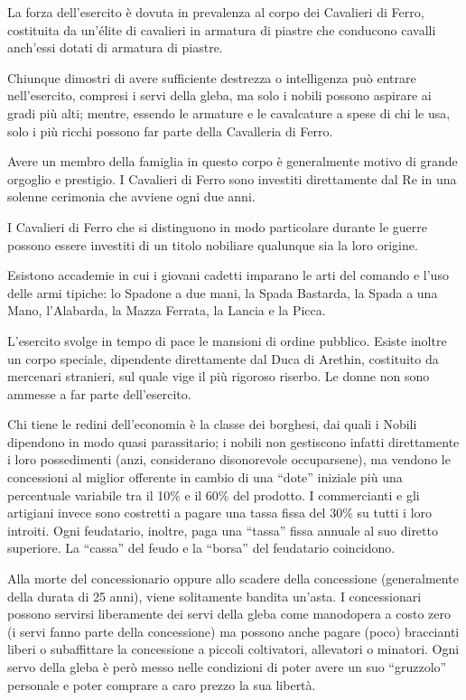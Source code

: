 La forza dell'esercito \`e dovuta in prevalenza al corpo dei Cavalieri
di Ferro, costituita da un'\'elite di cavalieri in armatura di piastre
che conducono cavalli anch'essi dotati di armatura di piastre.

Chiunque dimostri di avere sufficiente destrezza o intelligenza
pu\`o entrare nell'esercito, compresi i servi della gleba, ma solo i
nobili possono aspirare ai gradi pi\`u alti; mentre, essendo le
armature e le cavalcature a spese di chi le usa, solo i pi\`u ricchi
possono far parte della Cavalleria di Ferro.

Avere un membro della famiglia in questo corpo \`e generalmente
motivo di grande orgoglio e prestigio. I Cavalieri di Ferro sono
investiti direttamente dal Re in una solenne cerimonia che avviene
ogni due anni.

I Cavalieri di Ferro che si distinguono in modo particolare durante le
guerre possono essere investiti di un titolo nobiliare qualunque sia
la loro origine.

Esistono accademie in cui i giovani cadetti imparano le arti del
comando e l'uso delle armi tipiche: lo Spadone a due mani, la Spada
Bastarda, la Spada a una Mano, l'Alabarda, la Mazza Ferrata, la Lancia
e la Picca. 

L'esercito svolge in tempo di pace le mansioni di ordine pubblico.
Esiste inoltre un corpo speciale, dipendente direttamente dal Duca di
Arethin, costituito da mercenari stranieri, sul quale vige il pi\`u
rigoroso riserbo. Le donne non sono ammesse a far parte dell'esercito.

\Economia Chi tiene le redini dell'economia \`e la classe dei
borghesi, dai quali i Nobili dipendono in modo quasi parassitario; i
nobili non gestiscono infatti direttamente i loro possedimenti (anzi,
considerano disonorevole occuparsene), ma vendono le concessioni al
miglior offerente in cambio di una ``dote'' iniziale pi\`u una
percentuale variabile tra il 10\% e il 60\% del prodotto. I
commercianti e gli artigiani invece sono costretti a pagare una tassa
fissa del 30\% su tutti i loro introiti.  Ogni feudatario, inoltre,
paga una ``tassa'' fissa annuale al suo diretto superiore.
La ``cassa'' del feudo e la ``borsa'' del feudatario coincidono.

Alla morte del concessionario oppure allo scadere della concessione
(generalmente della durata di 25 anni), viene solitamente bandita
un'asta. I concessionari possono servirsi liberamente dei servi della
gleba come manodopera a costo zero (i servi fanno parte della
concessione) ma possono anche pagare (poco) braccianti liberi o
subaffittare la concessione a piccoli coltivatori, allevatori o
minatori. Ogni servo della gleba \`e per\`o messo nelle condizioni di
poter avere un suo ``gruzzolo'' personale e poter comprare a caro
prezzo la sua libert\`a.

